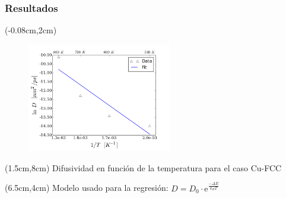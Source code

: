 \begin{frame}
 \frametitle{Resultados}
 
  \begin{textblock*}{6.5cm}(-0.08cm,2cm) 
   \begin{figure}[htp]
    \centering
    \includegraphics[width=6.3cm]{../Figures/Cap_4/FCCDiff_vs_temp_fit.png}
   \end{figure}
  \end{textblock*}
  \begin{textblock*}{10cm}(1.5cm,8cm) 
    \centering
    Difusividad en función de la temperatura para el caso Cu-FCC
  \end{textblock*}
  
  \begin{textblock*}{6cm}(6.5cm,4cm)
    Modelo usado para la regresión: 
    $D = D_{0}\cdot \mathrm{e}^{\frac{-\Delta E}{k_{B} T}}$
  \end{textblock*} 
\end{frame}

